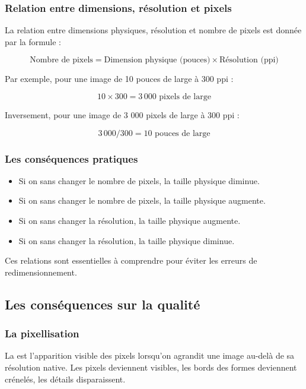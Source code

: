 \subsubsection{Relation entre dimensions, résolution et pixels}

La relation entre dimensions physiques, résolution et nombre de pixels est donnée par la formule :

\[
\text{Nombre de pixels} = \text{Dimension physique (pouces)} \times \text{Résolution (ppi)}
\]

Par exemple, pour une image de 10 pouces de large à 300 ppi :

\[
10 \times 300 = 3\,000 \text{ pixels de large}
\]

Inversement, pour une image de 3 000 pixels de large à 300 ppi :

\[
3\,000 / 300 = 10 \text{ pouces de large}
\]

\subsubsection{Les conséquences pratiques}

\begin{itemize}
    \item Si on  sans changer le nombre de pixels, la taille physique diminue.
    \item Si on  sans changer le nombre de pixels, la taille physique augmente.
    \item Si on  sans changer la résolution, la taille physique augmente.
    \item Si on  sans changer la résolution, la taille physique diminue.
\end{itemize}

Ces relations sont essentielles à comprendre pour éviter les erreurs de redimensionnement.

\subsection{Les conséquences sur la qualité}

\subsubsection{La pixellisation}

La  est l'apparition visible des pixels lorsqu'on agrandit une image au-delà de sa résolution native. Les pixels deviennent visibles, les bords des formes deviennent crénelés, les détails disparaissent.

